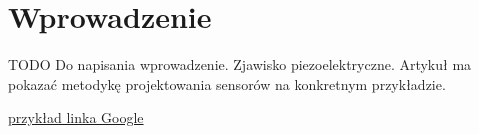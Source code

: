 \section{Wprowadzenie}
\label{sec:introduction}

TODO
Do napisania wprowadzenie. Zjawisko piezoelektryczne. Artykuł ma pokazać metodykę projektowania sensorów na konkretnym przykładzie.

\href{http://www.google.com}{przykład linka Google}